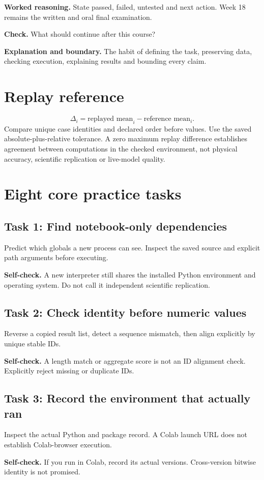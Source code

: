 \textbf{Worked reasoning.} State passed, failed, untested and next action. Week 18 remains the written and oral final examination.

\textbf{Check.} What should continue after this course?

\textbf{Explanation and boundary.} The habit of defining the task, preserving data, checking execution, explaining results and bounding every claim.

\section{Replay reference}\[\Delta_i=\text{replayed mean}_i-\text{reference mean}_i.\]Compare unique case identities and declared order before values. Use the saved absolute-plus-relative tolerance. A zero maximum replay difference establishes agreement between computations in the checked environment, not physical accuracy, scientific replication or live-model quality.
\section{Eight core practice tasks}
\subsection{Task 1: Find notebook-only dependencies}
Predict which globals a new process can see. Inspect the saved source and explicit path arguments before executing.

\textbf{Self-check.} A new interpreter still shares the installed Python environment and operating system. Do not call it independent scientific replication.
\subsection{Task 2: Check identity before numeric values}
Reverse a copied result list, detect a sequence mismatch, then align explicitly by unique stable IDs.

\textbf{Self-check.} A length match or aggregate score is not an ID alignment check. Explicitly reject missing or duplicate IDs.
\subsection{Task 3: Record the environment that actually ran}
Inspect the actual Python and package record. A Colab launch URL does not establish Colab-browser execution.

\textbf{Self-check.} If you run in Colab, record its actual versions. Cross-version bitwise identity is not promised.
